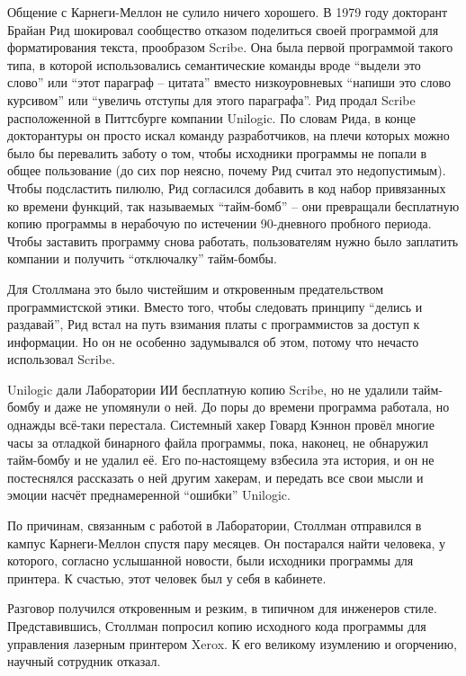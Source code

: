 Общение с Карнеги-Меллон не сулило ничего хорошего. В 1979 году докторант Брайан Рид шокировал сообщество отказом поделиться своей программой для форматирования текста, прообразом Scribe. Она была первой программой такого типа, в которой использовались семантические команды вроде \enquote{выдели это слово} или \enquote{этот параграф -- цитата} вместо низкоуровневых \enquote{напиши это слово курсивом} или \enquote{увеличь отступы для этого параграфа}. Рид продал Scribe расположенной в Питтсбурге компании Unilogic. По словам Рида, в конце докторантуры он просто искал команду разработчиков, на плечи которых можно было бы перевалить заботу о том, чтобы исходники программы не попали в общее пользование (до сих пор неясно, почему Рид считал это недопустимым). Чтобы подсластить пилюлю, Рид согласился добавить в код набор привязанных ко времени функций, так называемых \enquote{тайм-бомб} -- они превращали бесплатную копию программы в нерабочую по истечении 90-дневного пробного периода. Чтобы заставить программу снова работать, пользователям нужно было заплатить компании и получить \enquote{отключалку} тайм-бомбы.

Для Столлмана это было чистейшим и откровенным предательством программистской этики. Вместо того, чтобы следовать принципу \enquote{делись и раздавай}, Рид встал на путь взимания платы с программистов за доступ к информации. Но он не особенно задумывался об этом, потому что нечасто использовал Scribe.

Unilogic дали Лаборатории ИИ бесплатную копию Scribe, но не удалили тайм-бомбу и даже не упомянули о ней. До поры до времени программа работала, но однажды всё-таки перестала. Системный хакер Говард Кэннон провёл многие часы за отладкой бинарного файла программы, пока, наконец, не обнаружил тайм-бомбу и не удалил её. Его по-настоящему взбесила эта история, и он не постеснялся рассказать о ней другим хакерам, и передать все свои мысли и эмоции насчёт преднамеренной \enquote{ошибки} Unilogic.

По причинам, связанным с работой в Лаборатории, Столлман отправился в кампус Карнеги-Меллон спустя пару месяцев. Он постарался найти человека, у которого, согласно услышанной новости, были исходники программы для принтера. К счастью, этот человек был у себя в кабинете.

Разговор получился откровенным и резким, в типичном для инженеров стиле. Представившись, Столлман попросил копию исходного кода программы для управления лазерным принтером Xerox. К его великому изумлению и огорчению, научный сотрудник отказал.


